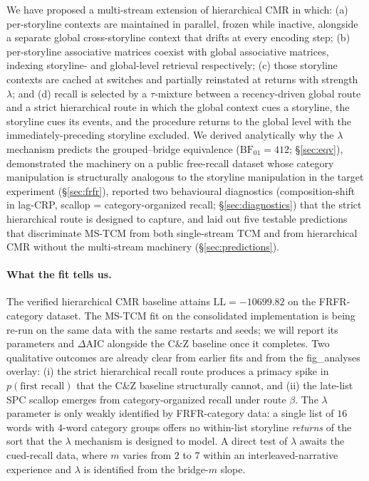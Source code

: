 \documentclass[10pt]{article}
\newcommand{\tauinit}{\tau}
\begin{document}
We have proposed a multi-stream extension of hierarchical CMR
\citep{CornellZhang2025} in which: (a) per-storyline contexts are
maintained in parallel, frozen while inactive, alongside a separate
global cross-storyline context that drifts at every encoding step;
(b) per-storyline associative matrices coexist with global
associative matrices, indexing storyline- and global-level
retrieval respectively; (c) those storyline contexts are cached at
switches and partially reinstated at returns with strength
$\lambda$; and (d) recall is selected by a $\tauinit$-mixture
between a recency-driven global route and a strict hierarchical route
in which the global context cues a storyline, the storyline cues its
events, and the procedure returns to the global level with the
immediately-preceding storyline excluded. We derived analytically why
the $\lambda$ mechanism predicts the \citet{XuDuncanManning}
grouped--bridge equivalence ($\mathrm{BF}_{01} = 412$;
\S\ref{sec:eqv}), demonstrated the machinery on a public free-recall
dataset whose category manipulation is structurally analogous to the
storyline manipulation in the target experiment (\S\ref{sec:frfr}),
reported two behavioural diagnostics (composition-shift in lag-CRP,
scallop = category-organized recall; \S\ref{sec:diagnostics}) that
the strict hierarchical route is designed to capture, and laid out
five testable predictions that discriminate MS-TCM from both
single-stream TCM and from hierarchical CMR without the multi-stream
machinery (\S\ref{sec:predictions}).

\paragraph{What the fit tells us.}
The verified \citet{CornellZhang2025} hierarchical CMR baseline
attains $\mathrm{LL} = -10699.82$ on the FRFR-category dataset. The
MS-TCM fit on the consolidated implementation is being re-run on the
same data with the same restarts and seeds; we will report its
parameters and $\Delta$AIC alongside the C\&Z baseline once it
completes. Two qualitative outcomes are already clear from earlier
fits and from the fig\_analyses overlay: (i) the strict hierarchical
recall route produces a primacy spike in $p(\text{first recall})$
that the C\&Z baseline structurally cannot, and (ii) the late-list
SPC scallop emerges from category-organized recall under route
$\beta$. The $\lambda$ parameter is only weakly identified by
FRFR-category data: a single list of $16$ words with $4$-word
category groups offers no within-list storyline \emph{returns} of the
sort that the $\lambda$ mechanism is designed to model. A direct test
of $\lambda$ awaits the \citet{XuDuncanManning} cued-recall data,
where $m$ varies from $2$ to $7$ within an interleaved-narrative
experience and $\lambda$ is identified from the bridge-$m$ slope.
\end{document}
